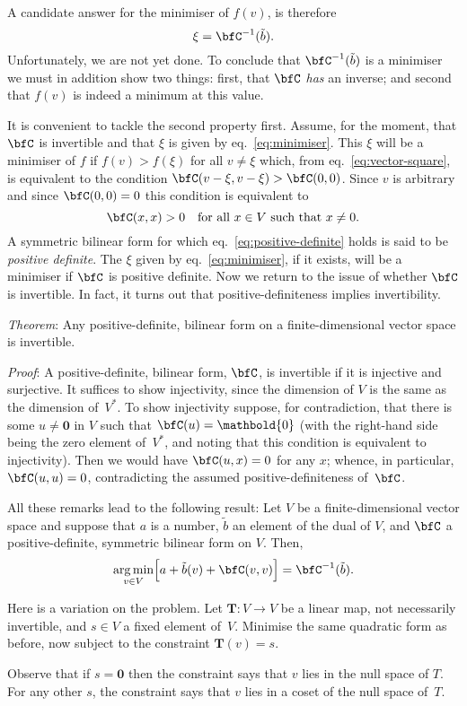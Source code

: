 \documentclass[10pt, a4paper]{article}
\newcommand{\bzero}{\mathbold{0}} %
\DeclareMathOperator*{\argmin}{arg\,min}
\begin{document}
A candidate answer for the minimiser of $f(v)$, is therefore
\begin{equation}
  \label{eq:minimiser}
  \xi = \bfC^{-1}(\tilde{b}).
\end{equation}
Unfortunately, we are not yet done. To conclude that
$\bfC^{-1}(\tilde{b})$ is a minimiser we must in addition show two
things: first, that $\bfC$ \emph{has} an inverse; and second that
$f(v)$ is indeed a minimum at this value.

It is convenient to tackle the second property first. Assume, for the
moment, that $\bfC$ is invertible and that $\xi$ is given by
eq.~\eqref{eq:minimiser}. This $\xi$ will be a minimiser of $f$ if
$f(v)>f(\xi)$ for all $v \neq \xi$ which, from eq.~\eqref{eq:vector-square},
is equivalent to the condition $\bfC(v-\xi,v-\xi)>\bfC(0,0)$. Since
$v$ is arbitrary and since $\bfC(0,0)=0$ this condition is equivalent
to
\begin{equation}
  \label{eq:positive-definite}
  \bfC(x,x) > 0 \quad\text{for all $x\in V$ such that $x\neq0$}.
\end{equation}
A symmetric bilinear form for which eq.~\eqref{eq:positive-definite}
holds is said to be \emph{positive definite}. The $\xi$ given by
eq.~\eqref{eq:minimiser}, if it exists, will be a minimiser if $\bfC$
is positive definite. Now we return to the issue of whether $\bfC$ is
invertible. In fact, it turns out that positive-definiteness implies
invertibility.

\emph{Theorem}: Any positive-definite, bilinear form on a
finite-dimensional vector space is invertible.

\emph{Proof}: A positive-definite, bilinear form, $\bfC$, is
invertible if it is injective and surjective. It suffices to show
injectivity, since the dimension of $V$ is the same as the dimension
of~$V^*$. To show injectivity suppose, for contradiction, that there
is some $u\neq\bzero$ in $V$ such that $\bfC(u)=\bzero$ (with the
right-hand side being the zero element of~$V^*$, and noting that this
condition is equivalent to injectivity). Then we would have
$\bfC(u, x) =0$ for any $x$; whence, in particular, $\bfC(u,u)=0$,
contradicting the assumed positive-definiteness of~$\bfC$.

All these remarks lead to the following result: Let $V$ be a
finite-dimensional vector space and suppose that $a$ is a number,
$\tilde{b}$ an element of the dual of $V$, and $\bfC$ a
positive-definite, symmetric bilinear form on $V$. Then,
\[
  \argmin_{v\in V} \Bigl[a +\tilde{b}(v) + \bfC(v,v) \Bigr] = \bfC^{-1}(\tilde{b}). 
\]

Here is a variation on the problem. Let $\bm{T}:V\to V$ be a linear map,
not necessarily invertible, and $s\in V$ a fixed element
of~$V$. Minimise the same quadratic form as before, now subject to the
constraint $\bm{T}(v)= s$.

Observe that if $s=\bzero$ then the constraint says that $v$ lies in
the null space of $T$. For any other $s$, the constraint says that $v$
lies in a coset of the null space of~$T$. 
\end{document}

